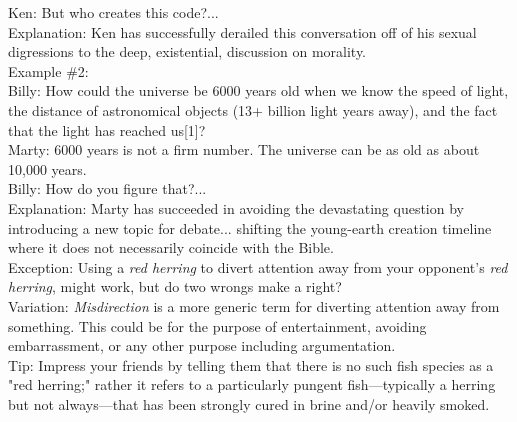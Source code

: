 \documentclass[a4paper,12pt,single,pdftex]{scrartcl}
\begin{document}
{      
        Ken: But who creates this code?...
      \\

      
        Explanation: Ken has successfully derailed this conversation off of his sexual digressions to the deep, existential, discussion on morality.
      \\

      
        Example \#2:
      \\

      
        Billy: How could the universe be 6000 years old when we know the speed of light, the distance of astronomical objects (13+ billion light years away), and the fact that the light has reached us[1]?
      \\

      
        Marty: 6000 years is not a firm number.  The universe can be as old as about 10,000 years.
      \\

      
        Billy: How do you figure that?...
      \\

      
        Explanation: Marty has succeeded in avoiding the devastating question by introducing a new topic for debate... shifting the young-earth creation timeline where it does not necessarily coincide with the Bible.
      \\

      
        Exception: Using a {\it red herring} to divert attention away from your opponent's {\it red herring}, might work, but do two wrongs make a right?
      \\

      
        Variation: {\em Misdirection} is a more generic term for diverting attention away from something. This could be for the purpose of entertainment, avoiding embarrassment, or any other purpose including argumentation.
      \\

      
        Tip: Impress your friends by telling them that there is no such fish species as a "red herring;" rather it refers to a particularly pungent fish—typically a herring but not always—that has been strongly cured in brine and/or heavily smoked.
      \\

    
  }
\end{document}
